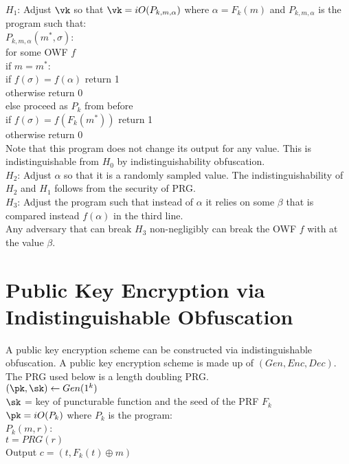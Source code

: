 \noindent $H_1$: Adjust $\vk$ so that $\vk = iO(P_{k, m, \alpha})$ where $\alpha = F_k(m)$ and $P_{k, m, \alpha}$ is the program such that:\\
\indent $P_{k,m, \alpha}(m^*, \sigma)$:\\
\indent \indent for some OWF $f$\\
\indent \indent \indent if $m = m^*$:\\
\indent \indent \indent \indent if $f(\sigma) = f(\alpha)$ return 1\\
\indent \indent \indent \indent otherwise return 0\\
\indent \indent \indent else proceed as $P_{k}$ from before\\
\indent \indent \indent \indent if $f(\sigma) = f(F_k(m^*))$ return 1\\
\indent \indent \indent \indent otherwise return 0\\
\noindent Note that this program does not change its output for any value. This is indistinguishable from $H_0$  by indistinguishability obfuscation.\\

\noindent $H_2$: Adjust $\alpha$ so that it is a randomly sampled value. The indistinguishability of $H_2$ and $H_1$ follows from the security of PRG.  \\
\noindent $H_3$: Adjust the program such that instead of $\alpha$ it relies on some $\beta$ that is compared instead $f(\alpha)$ in the third line.\\

Any adversary that can break $H_3$ non-negligibly can break the OWF $f$ with at the value $\beta$.

\section{Public Key Encryption via Indistinguishable Obfuscation}
A public key encryption scheme can be constructed via indistinguishable obfuscation.  A public key encryption scheme is made up of $(Gen, Enc, Dec)$.  The PRG used below is a length doubling PRG.\\

\noindent $(\pk, \sk) \leftarrow Gen(1^k)$\\
\indent $\sk$ = key of puncturable function and the seed of the PRF $F_k$\\
\indent $\pk = iO(P_k)$ where $P_k$ is the program:\\
\indent \indent $P_k(m, r)$:\\
\indent \indent \indent $t = PRG(r)$\\
\indent \indent \indent Output $c = (t, F_k(t) \oplus m)$\\

